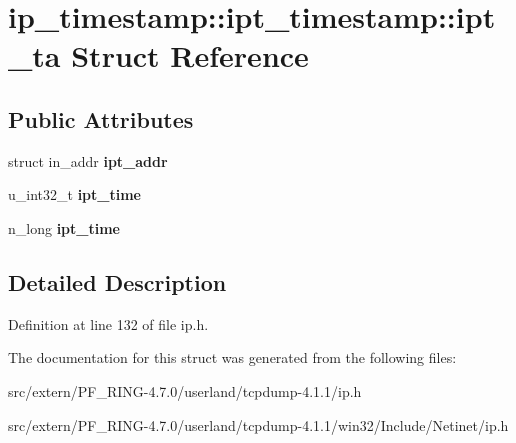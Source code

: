 \hypertarget{structip__timestamp_1_1ipt__timestamp_1_1ipt__ta}{
\section{ip\_\-timestamp::ipt\_\-timestamp::ipt\_\-ta Struct Reference}
\label{structip__timestamp_1_1ipt__timestamp_1_1ipt__ta}
}
\subsection*{Public Attributes}
\begin{DoxyCompactItemize}
\item 
\hypertarget{structip__timestamp_1_1ipt__timestamp_1_1ipt__ta_a8ec80581dfc8435e6a746cdb528f7208}{
struct in\_\-addr {\bfseries ipt\_\-addr}}
\label{structip__timestamp_1_1ipt__timestamp_1_1ipt__ta_a8ec80581dfc8435e6a746cdb528f7208}

\item 
\hypertarget{structip__timestamp_1_1ipt__timestamp_1_1ipt__ta_aa755f910b8c36d190abc449af156659e}{
u\_\-int32\_\-t {\bfseries ipt\_\-time}}
\label{structip__timestamp_1_1ipt__timestamp_1_1ipt__ta_aa755f910b8c36d190abc449af156659e}

\item 
\hypertarget{structip__timestamp_1_1ipt__timestamp_1_1ipt__ta_a4a029c5c4b19e3510ce44fe88fb1c754}{
n\_\-long {\bfseries ipt\_\-time}}
\label{structip__timestamp_1_1ipt__timestamp_1_1ipt__ta_a4a029c5c4b19e3510ce44fe88fb1c754}

\end{DoxyCompactItemize}


\subsection{Detailed Description}


Definition at line 132 of file ip.h.



The documentation for this struct was generated from the following files:\begin{DoxyCompactItemize}
\item 
src/extern/PF\_\-RING-\/4.7.0/userland/tcpdump-\/4.1.1/ip.h\item 
src/extern/PF\_\-RING-\/4.7.0/userland/tcpdump-\/4.1.1/win32/Include/Netinet/ip.h\end{DoxyCompactItemize}

